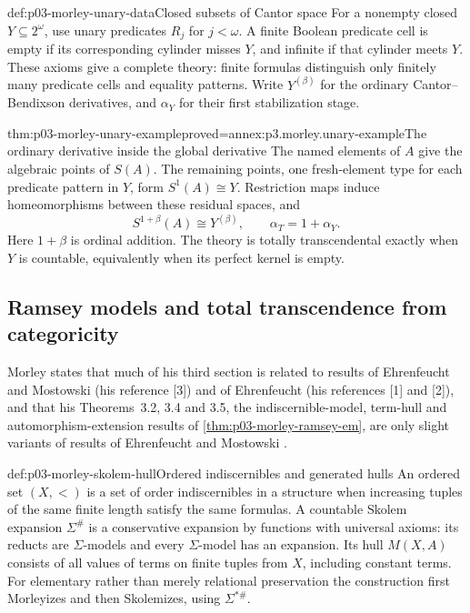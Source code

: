 \begin{hbexample}{def:p03-morley-unary-data}{Closed subsets of Cantor space}
For a nonempty closed \(Y\subseteq2^\omega\), use unary predicates
\(R_j\) for \(j<\omega\). A finite Boolean predicate cell is empty
if its corresponding cylinder misses \(Y\), and infinite if that
cylinder meets \(Y\). These axioms give a complete theory: finite
formulas distinguish only finitely many predicate cells and equality
patterns. Write \(Y^{(\beta)}\) for the ordinary Cantor--Bendixson
derivatives, and \(\alpha_Y\) for their first stabilization stage.
\end{hbexample}

\begin{hbtheorem}{thm:p03-morley-unary-example}{proved=annex:p3.morley.unary-example}{The ordinary derivative inside the global derivative}
The named elements of \(A\) give the algebraic points of \(S(A)\).
The remaining points, one fresh-element type for each predicate
pattern in \(Y\), form \(S^1(A)\cong Y\). Restriction maps induce
homeomorphisms between these residual spaces, and
\[
 S^{1+\beta}(A)\cong Y^{(\beta)},\qquad
 \alpha_T=1+\alpha_Y.
\]
Here \(1+\beta\) is ordinal addition. The theory is totally
transcendental exactly when \(Y\) is countable, equivalently when
its perfect kernel is empty.
\end{hbtheorem}

\subsection{Ramsey models and total transcendence from categoricity}
\label{sec:p03-morley-ramsey-models}

Morley states that much of his third section is related to results of
Ehrenfeucht and Mostowski (his reference [3]) and of Ehrenfeucht (his
references [1] and [2]), and that his Theorems~3.2, 3.4 and 3.5, the
indiscernible-model, term-hull and automorphism-extension results of
\cref{thm:p03-morley-ramsey-em}, are only slight variants of results of
Ehrenfeucht and Mostowski \cite[pp.~515 and 525]{Morley1965}.

\begin{hbdefinition}{def:p03-morley-skolem-hull}{Ordered indiscernibles and generated hulls}
An ordered set \((X,<)\) is a set of order indiscernibles in a
structure when increasing tuples of the same finite length satisfy
the same formulas. A countable Skolem expansion \(\Sigma^\#\)
is a conservative expansion by functions with universal axioms:
its reducts are \(\Sigma\)-models and every \(\Sigma\)-model
has an expansion. Its hull \(M(X,A)\) consists of all values of
terms on finite tuples from \(X\), including constant terms.
For elementary rather than merely relational preservation the
construction first Morleyizes and then Skolemizes, using
\(\Sigma^{*\#}\).
\end{hbdefinition}

